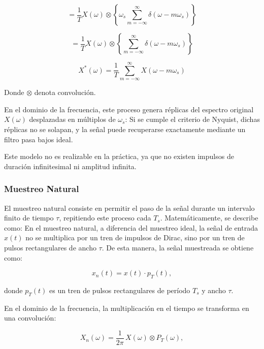 \begin{equation}
    = \frac{1}{T} X(\omega) \otimes \left\{ \omega_s \sum_{m=-\infty}^{\infty} \delta(\omega - m\omega_s) \right\}
\end{equation}

\begin{equation}
    = \frac{1}{T} X(\omega) \otimes \left\{ \sum_{m=-\infty}^{\infty} \delta(\omega - m\omega_s) \right\}
\end{equation}

\begin{equation}
    X^*(\omega) = \frac{1}{T} \sum_{m=-\infty}^{\infty} X(\omega - m\omega_s)
\end{equation}


Donde $\otimes$ denota convolución. 


En el dominio de la frecuencia, este proceso genera réplicas del espectro original $X(\omega)$ desplazadas en múltiplos de $\omega_s$:
Si se cumple el criterio de Nyquist, dichas réplicas no se solapan, y la señal puede recuperarse
exactamente mediante un filtro pasa bajos ideal. 

\bigskip

Este modelo no es realizable en la práctica, ya que no existen impulsos de duración infinitesimal ni amplitud infinita.

\subsubsection{Muestreo Natural}
El muestreo natural consiste en permitir el paso de la señal durante un intervalo finito de tiempo $\tau$, repitiendo este proceso cada $T_s$. Matemáticamente, se describe como:
En el muestreo natural, a diferencia del muestreo ideal, la señal de entrada $x(t)$ no se multiplica 
por un tren de impulsos de Dirac, sino por un tren de pulsos rectangulares de ancho $\tau$. 
De esta manera, la señal muestreada se obtiene como:

\begin{equation}
    x_n(t) = x(t) \cdot p_T(t),
\end{equation}

donde $p_T(t)$ es un tren de pulsos rectangulares de período $T_s$ y ancho $\tau$.

\bigskip

En el dominio de la frecuencia, la multiplicación en el tiempo se transforma en una convolución:

\begin{equation}
    X_n(\omega) = \frac{1}{2\pi} \, X(\omega) \otimes P_T(\omega),
\end{equation}

